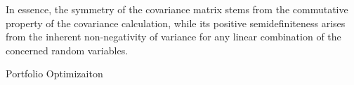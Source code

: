 In essence, the symmetry of the covariance matrix stems from the commutative property of the covariance calculation, while its positive semidefiniteness arises from the inherent non-negativity of variance for any linear combination of the concerned random variables.

\begin{examplewithcode}{Portfolio Optimizaiton}{}

\end{examplewithcode}


